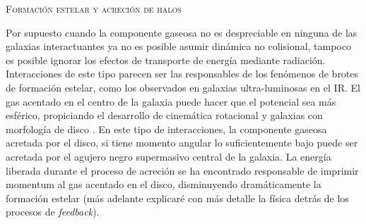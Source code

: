 \documentclass[xcolor=dvipsnames,4pt,hyperref={colorlinks,citecolor=black,linkcolor=black,urlcolor=black}]{beamer}
\begin{document}
\begin{frame}[allowframebreaks]{\textsc{Formación estelar y acreción de halos}}
\begin{description}
Por supuesto cuando la componente gaseosa no es despreciable en ninguna de las galaxias
interactuantes ya no es posible asumir dinámica no colisional, tampoco es posible ignorar los
efectos de transporte de energía mediante radiación. Interacciones de este tipo parecen ser las
responsables de los fenómenos de brotes de formación estelar, como los observados en galaxias
ultra-luminosas en el IR. El gas acentado en el centro de la galaxia puede hacer que el potencial
sea más esférico, propiciando el desarrollo de cinemática rotacional y galaxias con morfología de
disco \citep{Jesseit2007}. En este tipo de interacciones, la componente gaseosa acretada por el
disco, si tiene momento angular lo suficientemente bajo puede ser acretada por el agujero negro
supermasivo central de la galaxia. La energía liberada durante el proceso de acreción se ha
encontrado responsable de imprimir momentum al gas acentado en el disco, disminuyendo dramáticamente
la formación estelar (más adelante explicaré con más detalle la física detrás de los procesos de
\emph{feedback}).
%
\end{description}
%
\end{frame}
\end{document}
